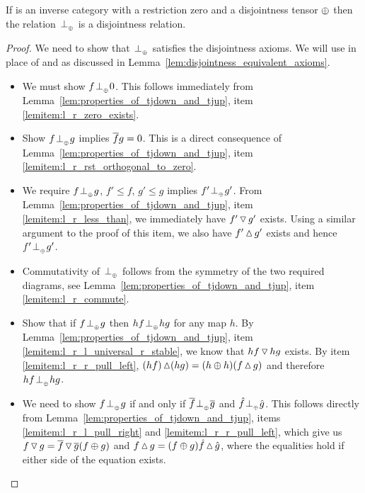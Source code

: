 \begin{lemma}\label{lem:tensor_disjointness_is_disjointness}
  If \X is an inverse category with a restriction zero and a disjointness tensor $\oplus$ then
  the relation ${}_{{}_{}}{\perp_{{}_{\oplus}}}$ is a disjointness relation.
\end{lemma}
\begin{proof}
  We need to show that ${}_{{}_{}}{\perp_{{}_{\oplus}}}$ satisfies the disjointness axioms. We will use  in
  place of  and  as discussed in
  Lemma~\ref{lem:disjointness_equivalent_axioms}.
  \begin{itemize}
    \item[\axiom{Dis}{1}] We must show $f {}_{{}_{}}{\perp_{{}_{\oplus}}} 0$. This follows immediately from
      Lemma~\ref{lem:properties_of_tjdown_and_tjup}, item \ref{lemitem:l_r_zero_exists}.
    \item[\axiom{Dis}{2}] Show $f {}_{{}_{}}{\perp_{{}_{\oplus}}} g$ implies $\overline{f}g = 0$. This is a direct consequence of
      Lemma~\ref{lem:properties_of_tjdown_and_tjup}, item
      \ref{lemitem:l_r_rst_orthogonal_to_zero}.
    \item[\axiom{Dis}{3}] We require $f{}_{{}_{}}{\perp_{{}_{\oplus}}} g$, $f' \le f$, $g' \le g$ implies $f' {}_{{}_{}}{\perp_{{}_{\oplus}}} g'$.
      From Lemma~\ref{lem:properties_of_tjdown_and_tjup}, item \ref{lemitem:l_r_less_than}, we
      immediately have $f' \operatorname{\triangledown} g'$ exists. Using a similar argument to the proof of this item,
      we also have $f' \operatorname{\vartriangle} g'$ exists and hence $f' {}_{{}_{}}{\perp_{{}_{\oplus}}} g'$.
    \item[\axiom{Dis}{4}] Commutativity of ${}_{{}_{}}{\perp_{{}_{\oplus}}}$ follows from the symmetry of the two required
    diagrams, see Lemma~\ref{lem:properties_of_tjdown_and_tjup}, item
      \ref{lemitem:l_r_commute}.
    \item[\axiom{Dis}{5}] Show that if $f{}_{{}_{}}{\perp_{{}_{\oplus}}} g$ then $h f {}_{{}_{}}{\perp_{{}_{\oplus}}} h g$ for any map $h$.
      By  Lemma~\ref{lem:properties_of_tjdown_and_tjup}, item
      \ref{lemitem:l_r_l_universal_r_stable}, we know that $h f \operatorname{\triangledown} h g$ exists.
      By item \ref{lemitem:l_r_r_pull_left},  $(h f)\operatorname{\vartriangle} (h g) = (h \oplus h) (f\operatorname{\vartriangle} g)$
      and therefore $h f {}_{{}_{}}{\perp_{{}_{\oplus}}} h g$.
    \item[\axiom{Dis}{6'}] We need to show $f{}_{{}_{}}{\perp_{{}_{\oplus}}} g$ if and only if $\overline{f} {}_{{}_{}}{\perp_{{}_{\oplus}}} \overline{g}$ and
      $\hat{f}{}_{{}_{}}{\perp_{{}_{\oplus}}} \hat{g}$. This follows directly from
      Lemma~\ref{lem:properties_of_tjdown_and_tjup}, items
      \ref{lemitem:l_r_l_pull_right} and       \ref{lemitem:l_r_r_pull_left}, which give us
      $f\operatorname{\triangledown} g = \overline{f}\operatorname{\triangledown} \overline{g} (f\oplus g)$ and
      $f\operatorname{\vartriangle} g = (f \oplus g)\hat{f}\operatorname{\vartriangle} \hat{g}$, where the equalities hold if either side of
      the equation exists.
  \end{itemize}
\end{proof}

